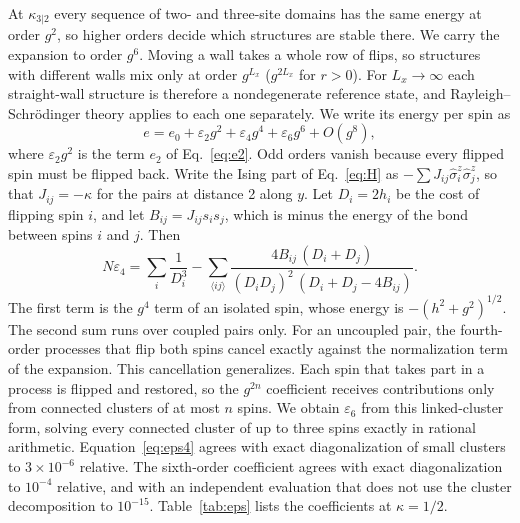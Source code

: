 At $\kappa_{3|2}$ every sequence of two- and three-site domains has the same energy at order $g^2$, so
higher orders decide which structures are stable there. We carry the expansion to order $g^6$. Moving a
wall takes a whole row of flips, so structures with different walls mix only at order $g^{L_x}$
($g^{2L_x}$ for $r>0$). For $L_x\to\infty$ each straight-wall structure is therefore a nondegenerate
reference state, and Rayleigh--Schr\"odinger theory applies to each one separately. We write its energy
per spin as
\begin{equation}
e=e_0+\varepsilon_2g^2+\varepsilon_4g^4+\varepsilon_6g^6+O(g^8),
\label{eq:series}
\end{equation}
where $\varepsilon_2g^2$ is the term $e_2$ of Eq.~\eqref{eq:e2}. Odd orders vanish because every flipped
spin must be flipped back. Write the Ising part of Eq.~\eqref{eq:H} as
$-\sum J_{ij}\hat\sigma^z_i\hat\sigma^z_j$, so that $J_{ij}=-\kappa$ for the pairs at distance 2 along $y$.
Let $D_i=2h_i$ be the cost of flipping spin $i$, and let $B_{ij}=J_{ij}s_is_j$, which is minus the energy of
the bond between spins $i$ and $j$. Then
\begin{equation}
N\varepsilon_4=\sum_i\frac{1}{D_i^3}
-\sum_{\langle ij\rangle}\frac{4B_{ij}\,(D_i+D_j)}{(D_iD_j)^2\,(D_i+D_j-4B_{ij})} .
\label{eq:eps4}
\end{equation}
The first term is the $g^4$ term of an isolated spin, whose energy is $-(h^2+g^2)^{1/2}$. The second sum
runs over coupled pairs only. For an uncoupled pair, the fourth-order processes that flip both spins cancel
exactly against the normalization term of the expansion. This cancellation generalizes. Each spin
that takes part in a process is flipped and restored, so the $g^{2n}$ coefficient receives contributions
only from connected clusters of at most $n$ spins. We obtain $\varepsilon_6$ from this linked-cluster form,
solving every connected cluster of up to three spins exactly in rational arithmetic.
%
Equation~\eqref{eq:eps4} agrees with exact diagonalization of small clusters to $3\times10^{-6}$ relative.
The sixth-order coefficient agrees with exact diagonalization to $10^{-4}$ relative,
and with an independent evaluation that does not use the cluster decomposition to $10^{-15}$.
Table~\ref{tab:eps} lists the coefficients at $\kappa=1/2$.

